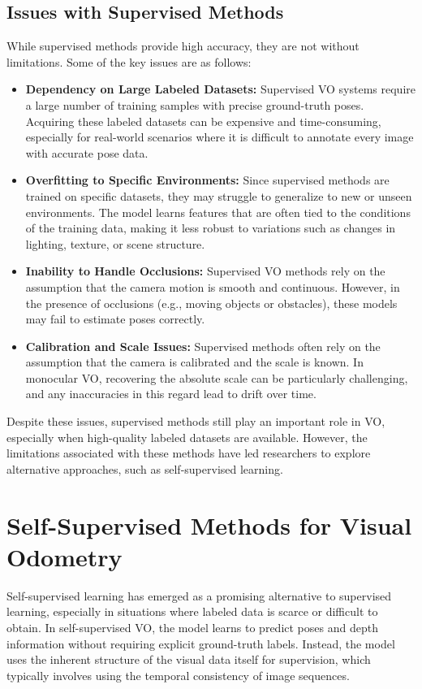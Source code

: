 \documentclass[12pt]{article}
\begin{document}
\subsection{Issues with Supervised Methods}
While supervised methods provide high accuracy, they are not without limitations. Some of the key issues are as follows:

\begin{itemize}
    \item \textbf{Dependency on Large Labeled Datasets:} Supervised VO systems require a large number of training samples with precise ground-truth poses. Acquiring these labeled datasets can be expensive and time-consuming, especially for real-world scenarios where it is difficult to annotate every image with accurate pose data.
    \item \textbf{Overfitting to Specific Environments:} Since supervised methods are trained on specific datasets, they may struggle to generalize to new or unseen environments. The model learns features that are often tied to the conditions of the training data, making it less robust to variations such as changes in lighting, texture, or scene structure.
    \item \textbf{Inability to Handle Occlusions:} Supervised VO methods rely on the assumption that the camera motion is smooth and continuous. However, in the presence of occlusions (e.g., moving objects or obstacles), these models may fail to estimate poses correctly.
    \item \textbf{Calibration and Scale Issues:} Supervised methods often rely on the assumption that the camera is calibrated and the scale is known. In monocular VO, recovering the absolute scale can be particularly challenging, and any inaccuracies in this regard lead to drift over time.
\end{itemize}

Despite these issues, supervised methods still play an important role in VO, especially when high-quality labeled datasets are available. However, the limitations associated with these methods have led researchers to explore alternative approaches, such as self-supervised learning.

\section{Self-Supervised Methods for Visual Odometry}
Self-supervised learning has emerged as a promising alternative to supervised learning, especially in situations where labeled data is scarce or difficult to obtain. In self-supervised VO, the model learns to predict poses and depth information without requiring explicit ground-truth labels. Instead, the model uses the inherent structure of the visual data itself for supervision, which typically involves using the temporal consistency of image sequences.
\end{document}
